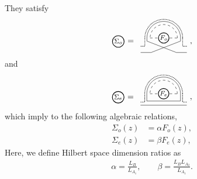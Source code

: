 \documentclass[aps,pra,groupedaddress,twocolumn,notitlepage,superscriptaddress,10pt]{revtex4-1}
\begin{document}
They satisfy
\begin{align}
\tikz[baseline=-0.5ex]{
    \draw[thick] (0,0) circle (0.25) node[anchor=center] {\footnotesize $\Sigma_o$};
    }
=
\ \,
\tikz[scale=.9,baseline=-1.5ex]{
    \draw[dashed] (-0.15,0) -- (1.15,0);
    \draw[thick,fill=white] (0.5,0) circle (0.25) node[anchor=center] {\footnotesize$F_o$};
    \draw (-0.3,0.0)-- (-0.3,-0.15);
    \draw (-0.3,-0.15)-- (1.1,-0.7);
    \draw (1.3,-0.15)-- (1.3,0.0);
    \draw (1.3,-0.15)-- (-0.1,-0.7);
    \draw (-0.6,-0.7)-- (-0.1,-0.7);
    \draw (1.1,-0.7)-- (1.6,-0.7);
    \draw[densely dotted,thick]   (-0.4,0.0)-- (-0.4,-0.4)--  (-0.6,-0.4);
    \draw[densely dotted,thick] (1.4,0.0) -- (1.4,-0.4) -- (1.6,-0.4) ;
    \draw[dashed] (1.15,0) arc (0:180:0.65);
    \draw (1.3,0) arc (0:180:0.8);
    \draw[densely dotted,thick] (1.4,0) arc (0:180:0.9);
    }\ ,
\end{align}
and
\begin{align}
\tikz[baseline=-0.5ex]{
    \draw[thick] (0,0) circle (0.25) node[anchor=center] {\footnotesize $\Sigma_e$};
    }
=
\ \,
\tikz[scale=.9,baseline=-1.5ex]{
    \draw[dashed] (-0.15,0) -- (1.15,0);
    \draw[thick,fill=white] (0.5,0) circle (0.25) node[anchor=center] {\footnotesize$F_e$};
    \draw (-0.3,0.0)-- (-0.3,-0.35)-- (1.3,-0.35) -- (1.3,0);
    \draw (-0.6,-0.55)-- (1.6,-0.55);
    \draw[densely dotted,thick]   (-0.4,0.0)-- (-0.4,-0.4)--  (-0.6,-0.4);
    \draw[densely dotted,thick] (1.4,0.0) -- (1.4,-0.4) -- (1.6,-0.4) ;
    \draw[dashed] (1.15,0) arc (0:180:0.65);
    \draw (1.3,0) arc (0:180:0.8);
    \draw[densely dotted,thick] (1.4,0) arc (0:180:0.9);
    }\ ,
\end{align}
which imply to the following algebraic relations,
\begin{align}
\Sigma_o(z)  &= \alpha F_o(z), \\
\Sigma_e(z)  &= \beta F_e(z), 
\end{align}
Here, we define Hilbert space dimension ratios  as
\begin{align}
\alpha = \frac{L_B}{L_{A_1}}, \qquad
\beta= \frac{L_B L_{A_2}}{L_{A_1}}.
\end{align}
\end{document}
